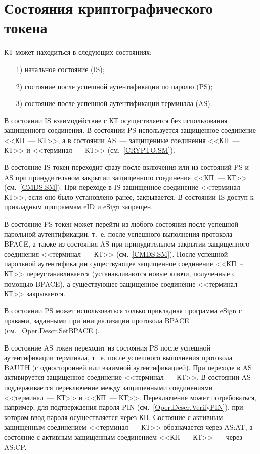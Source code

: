 \chapter{Состояния криптографического токена}\label{STATES}

КТ может находиться в следующих состояниях:
%
\begin{itemize}
\item[1)]
начальное состояние (IS);
\item[2)]
состояние после успешной аутентификации по паролю (PS);
\item[3)]
состояние после успешной аутентификации терминала (AS).
\end{itemize}

В состоянии IS взаимодействие с КТ осуществляется без использования 
защищенного соединения. В состоянии PS используется 
защищенное соединение <<КП~--- КТ>>, 
а в состоянии AS~--- защищенные соединения <<КП~--- КТ>> 
и <<терминал~--- КТ>> (см.~\ref{CRYPTO.SM}).

В состояние IS токен переходит сразу после включения 
или из состояний PS и AS при принудительном закрытии защищенного соединения 
<<КП~--- КТ>> (см.~\ref{CMDS.SM}). 
%
При переходе в IS защищенное соединение <<терминал~--- КТ>>, 
если оно было установлено ранее, закрывается.
В состоянии IS доступ к прикладным программам eID и eSign запрещен.

В состояние PS токен может перейти из любого состояния 
после успешной парольной аутентификации, 
т.~е. после успешного выполнения протокола BPACE,
а также из состояния AS при принудительном закрытии 
защищенного соединения <<терминал~--- КТ>> (см.~\ref{CMDS.SM}).
%
После успешной парольной аутентификации существующее защищенное соединение 
<<КП~-- КТ>> переустанавливается (устанавливаются новые ключи, полученные с 
помощью BPACE), а существующее защищенное соединение <<терминал~-- КТ>> 
закрывается. 

В состоянии PS может использоваться только прикладная программа eSign
с правами, заданными при инициализации протокола BPACE 
(см.~\ref{Oper.Descr.SetBPACE}).

В состояние AS токен переходит из состояния PS 
после успешной аутентификации терминала, т.~е. 
после успешного выполнения протокола BAUTH 
(с односторонней или взаимной аутентификацией).
%
При переходе в AS активируется защищенное соединение <<терминал~--- КТ>>.
В состоянии AS поддерживается переключение между защищенными соединениями 
<<терминал~--- КТ>> и <<КП~--- КТ>>. Переключение может потребоваться, 
например, для подтверждения пароля PIN (см.~\ref{Oper.Descr.VerifyPIN}), 
при котором ввод пароля осуществляется через КП. 
Состояние с активным защищенным соединением <<терминал~--- КТ>>
обозначается через AS:AT, 
а состояние с активным защищенным соединением <<КП~--- КТ>>~--- 
через AS:CP. 

